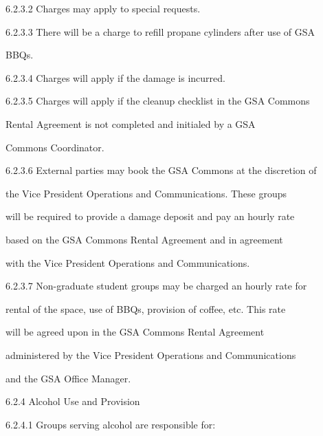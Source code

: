 6.2.3.2   Charges may apply to special requests.  



6.2.3.3   There will be a charge to refill propane cylinders after use of GSA  

            BBQs.   



6.2.3.4   Charges will apply if the damage is incurred.  



6.2.3.5   Charges  will apply if  the  cleanup checklist in  the  GSA  Commons  

            Rental   Agreement   is   not   completed   and   initialed   by   a   GSA  

            Commons Coordinator.  



6.2.3.6   External parties may book the GSA Commons at the discretion of  

            the Vice President Operations and Communications. These groups  

            will be required to provide a damage deposit and pay an hourly rate  

            based  on the  GSA Commons  Rental  Agreement  and in agreement  

            with the Vice President Operations and Communications.  



6.2.3.7  Non-graduate  student  groups  may  be  charged  an  hourly  rate  for  

            rental of the space, use of BBQs, provision of coffee, etc. This rate  

            will  be  agreed  upon  in  the  GSA  Commons  Rental  Agreement  

            administered by the Vice President Operations and Communications  

            and the GSA Office Manager.  



  



         6.2.4  Alcohol Use and Provision   



  



6.2.4.1   Groups serving alcohol are responsible for:   



  



